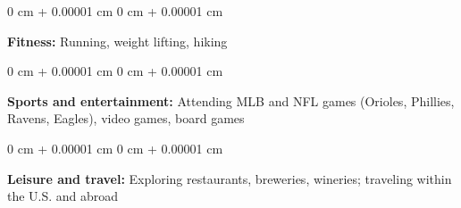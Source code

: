 \documentclass[10pt, letterpaper]{article}
\newenvironment{onecolentry}{
    \begin{adjustwidth}{
        0 cm + 0.00001 cm
    }{
        0 cm + 0.00001 cm
    }
}{
    \end{adjustwidth}
} %
\begin{document}
\vspace{0.2 cm}

\begin{onecolentry}
    \textbf{Fitness:} Running, weight lifting, hiking
\end{onecolentry}

\vspace{0.2 cm}

\begin{onecolentry}
    \textbf{Sports and entertainment:} Attending MLB and NFL games (Orioles, Phillies, Ravens, Eagles), video games, board games
\end{onecolentry}

\vspace{0.2 cm}

\begin{onecolentry}
    \textbf{Leisure and travel:} Exploring restaurants, breweries, wineries; traveling within the U.S. and abroad
\end{onecolentry}


    
\end{document}
